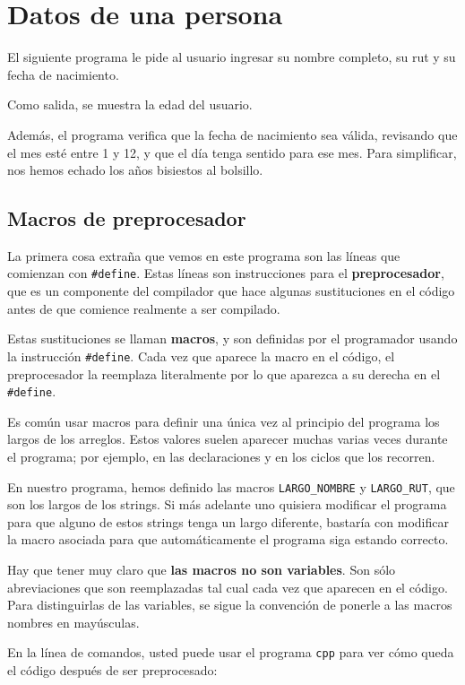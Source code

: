 \chapter{Datos de una persona}

El siguiente programa le pide al usuario ingresar su nombre completo, su
rut y su fecha de nacimiento.

Como salida, se muestra la edad del usuario.

Además, el programa verifica que la fecha de nacimiento sea válida,
revisando que el mes esté entre 1 y 12, y que el día tenga sentido para
ese mes. Para simplificar, nos hemos echado los años bisiestos al
bolsillo.

\section{Macros de preprocesador}

La primera cosa extraña que vemos en este programa son las líneas que
comienzan con \lstinline!#define!. Estas líneas son instrucciones para
el \textbf{preprocesador}, que es un componente del compilador que hace
algunas sustituciones en el código antes de que comience realmente a ser
compilado.

Estas sustituciones se llaman \textbf{macros}, y son definidas por el
programador usando la instrucción \lstinline!#define!. Cada vez que
aparece la macro en el código, el preprocesador la reemplaza
literalmente por lo que aparezca a su derecha en el \lstinline!#define!.

Es común usar macros para definir una única vez al principio del
programa los largos de los arreglos. Estos valores suelen aparecer
muchas varias veces durante el programa; por ejemplo, en las
declaraciones y en los ciclos que los recorren.

En nuestro programa, hemos definido las macros \lstinline!LARGO_NOMBRE!
y \lstinline!LARGO_RUT!, que son los largos de los strings. Si más
adelante uno quisiera modificar el programa para que alguno de estos
strings tenga un largo diferente, bastaría con modificar la macro
asociada para que automáticamente el programa siga estando correcto.

Hay que tener muy claro que \textbf{las macros no son variables}. Son
sólo abreviaciones que son reemplazadas tal cual cada vez que aparecen
en el código. Para distinguirlas de las variables, se sigue la
convención de ponerle a las macros nombres en mayúsculas.

En la línea de comandos, usted puede usar el programa \lstinline!cpp!
para ver cómo queda el código después de ser preprocesado:


